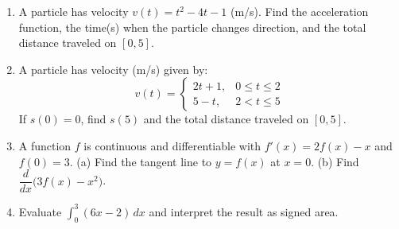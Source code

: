 \documentclass[12pt]{article}
\begin{document}
\begin{enumerate}[leftmargin=*, itemsep=1.0em, topsep=0.8em]
  \item A particle has velocity $v(t)=t^2-4t-1$ (m/s). Find the acceleration function, the time(s) when the particle changes direction, and the total distance traveled on $[0,5]$.

  \item A particle has velocity (m/s) given by:
  \[
  v(t)=
  \begin{cases}
  2t+1, & 0\le t\le 2\\
  5-t, & 2< t\le 5
  \end{cases}
  \]
  If $s(0)=0$, find $s(5)$ and the total distance traveled on $[0,5]$.

  \item A function $f$ is continuous and differentiable with $f'(x)=2f(x)-x$ and $f(0)=3$.
  (a) Find the tangent line to $y=f(x)$ at $x=0$.
  (b) Find $\dfrac{d}{dx}\big(3f(x)-x^2\big)$.

  \item Evaluate $\displaystyle \int_0^3 (6x-2)\,dx$ and interpret the result as signed area.
\end{enumerate}

\newpage
\end{document}
